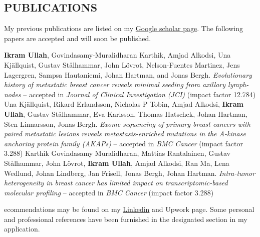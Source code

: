 \documentclass[margin, 10pt]{res} %
\begin{document}
\begin{resume}
\section{PUBLICATIONS} 
My previous publications are listed on my \href{https://scholar.google.com/citations?user=HjM0XDoAAAAJ&hl=en}{Google scholar page}. The following papers are accepted and will soon be published.
\begingroup
\renewcommand{\section}[2]{}%
\begin{thebibliography}{}
    \textbf{Ikram Ullah}, Govindasamy-Muralidharan Karthik, Amjad Alkodsi, Una Kj\"allquist, Gustav St\aa lhammar, John L\"ovrot, Nelson-Fuentes Martinez, Jens Lagergren, Sampsa Hautaniemi, Johan Hartman, and Jonas Bergh. \textit{Evolutionary history of metastatic breast cancer reveals minimal seeding from axillary lymph-nodes} -- accepted in {\sl Journal of Clinical Investigation (JCI)} (impact factor 12.784)
    Una Kj\"allquist, Rikard Erlandsson, Nicholas P Tobin, Amjad Alkodsi, \textbf{Ikram Ullah}, Gustav St\aa lhammar, Eva Karlsson, Thomas Hatschek, Johan Hartman, Sten Linnarsson, Jonas Bergh. \textit{Exome sequencing of primary breast cancers with paired metastatic lesions reveals metastasis-enriched mutations in the A-kinase anchoring protein family (AKAPs)} -- accepted in {\sl BMC Cancer} (impact factor 3.288)
    Karthik Govindasamy Muralidharan, Mattias Rantalainen, Gustav St\aa lhammar, John L\"ovrot, \textbf{Ikram Ullah}, Amjad Alkodsi, Ran Ma, Lena Wedlund, Johan Lindberg, Jan Frisell, Jonas Bergh, Johan Hartman. \textit{Intra-tumor heterogeneity in breast cancer has limited impact on transcriptomic-based molecular profiling} -- accepted in {\sl BMC Cancer} (impact factor 3.288)
\end{thebibliography}
\endgroup



\section{RECOMMEND- \\-ATIONS AND \\ REFERENCES } 
Recommendations may be found on my \href{https://www.linkedin.com/in/ikramu/}{Linkedin} and Upwork page. Some personal and professional references have been furnished in the designated section in my application.


\end{resume}
\end{document}
